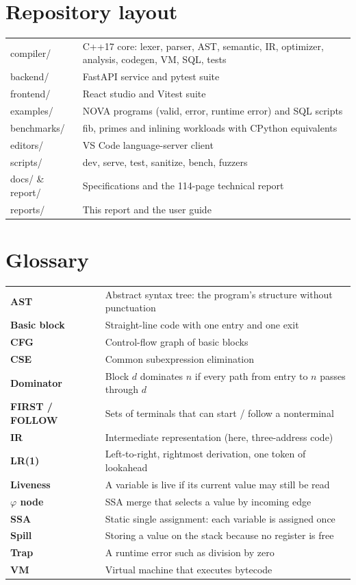 \documentclass[11pt,a4paper]{article}
\begin{document}
\section{Repository layout}
\begin{center}\small
\begin{tabularx}{\linewidth}{@{}>{\ttfamily}l X@{}}\toprule
compiler/&C++17 core: lexer, parser, AST, semantic, IR, optimizer, analysis, codegen, VM, SQL, tests\\
backend/&FastAPI service and pytest suite\\
frontend/&React studio and Vitest suite\\
examples/&NOVA programs (valid, error, runtime error) and SQL scripts\\
benchmarks/&fib, primes and inlining workloads with CPython equivalents\\
editors/&VS Code language-server client\\
scripts/&dev, serve, test, sanitize, bench, fuzzers\\
docs/ \& report/&Specifications and the 114-page technical report\\
reports/&This report and the user guide\\\bottomrule
\end{tabularx}
\end{center}

\section{Glossary}
\begin{center}\small
\begin{tabularx}{\linewidth}{@{}>{\bfseries}l X@{}}\toprule
AST&Abstract syntax tree: the program's structure without punctuation\\
Basic block&Straight-line code with one entry and one exit\\
CFG&Control-flow graph of basic blocks\\
CSE&Common subexpression elimination\\
Dominator&Block $d$ dominates $n$ if every path from entry to $n$ passes through $d$\\
FIRST / FOLLOW&Sets of terminals that can start / follow a nonterminal\\
IR&Intermediate representation (here, three-address code)\\
LR(1)&Left-to-right, rightmost derivation, one token of lookahead\\
Liveness&A variable is live if its current value may still be read\\
$\varphi$ node&SSA merge that selects a value by incoming edge\\
SSA&Static single assignment: each variable is assigned once\\
Spill&Storing a value on the stack because no register is free\\
Trap&A runtime error such as division by zero\\
VM&Virtual machine that executes bytecode\\\bottomrule
\end{tabularx}
\end{center}
\end{document}
